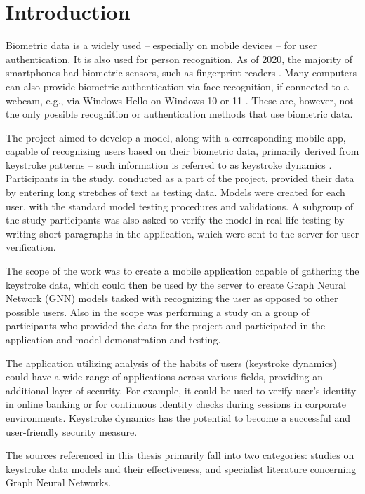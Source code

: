 
\chapter{Introduction}

Biometric data is a widely used -- especially on mobile devices -- for user authentication. It is also used for person recognition. As of 2020, the majority of smartphones had biometric sensors, such as fingerprint readers \cite{statista_biometric_phones_2025}. Many computers can also provide biometric authentication via face recognition, if connected to a webcam, e.g., via Windows Hello on Windows 10 or 11 \cite{microsoft_windows_hello_2025}. These are, however, not the only possible recognition or authentication methods that use biometric data.

The project aimed to develop a model, along with a corresponding mobile app, capable of recognizing users based on their biometric data, primarily derived from keystroke patterns -- such information is referred to as keystroke dynamics \cite{wikipedia_keystrokes_2025}. Participants in the study, conducted as a part of the project, provided their data by entering long stretches of text as testing data. Models were created for each user, with the standard model testing procedures and validations. A subgroup of the study participants was also asked to verify the model in real-life testing by writing short paragraphs in the application, which were sent to the server for user verification.

The scope of the work was to create a mobile application capable of gathering the keystroke data, which could then be used by the server to create Graph Neural Network (GNN) models tasked with recognizing the user as opposed to other possible users. Also in the scope was performing a study on a group of participants who provided the data for the project and participated in the application and model demonstration and testing.

The application utilizing analysis of the habits of users (keystroke dynamics) could have a wide range of applications across various fields, providing an additional layer of security. For example, it could be used to verify user's identity in online banking or for continuous identity checks during sessions in corporate environments. Keystroke dynamics has the potential to become a successful and user-friendly security measure.

The sources referenced in this thesis primarily fall into two categories: studies on keystroke data models and their effectiveness, and specialist literature concerning Graph Neural Networks.


